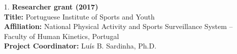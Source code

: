 \begin{enumerate}
  \item[1.] \textbf{Researcher grant (2017)} \\
  \textbf{Title:} Portuguese Institute of Sports and Youth \\
  \textbf{Affiliation:} National Physical Activity and Sports Surveillance System – Faculty of Human Kinetics, Portugal \\
  \textbf{Project Coordinator:} Luís B. Sardinha, Ph.D.

\end{enumerate}